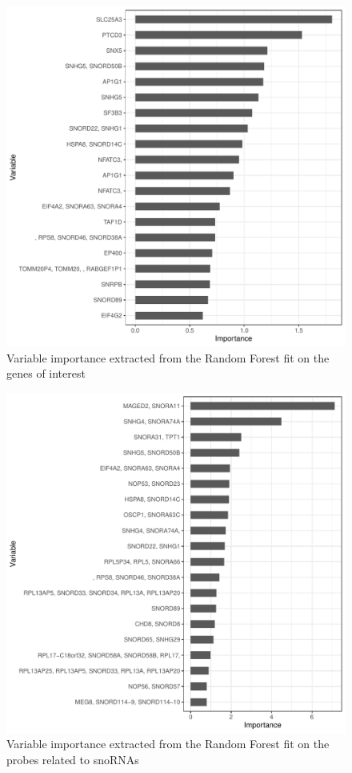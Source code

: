 \documentclass[journal]{IEEEtran}
\begin{document}
\begin{figure}[!ht]
    \centering
    \includegraphics[width=.8\linewidth]{images/vip_rf_voi.pdf}
    \caption{Variable importance extracted from the Random Forest fit on the genes of interest}\label{fig:vip_rf_interest}
\end{figure}

\begin{figure}[!ht]
    \centering
    \includegraphics[width=.8\linewidth]{images/vip_rf_snornas.pdf}
    \caption{Variable importance extracted from the Random Forest fit on the probes related to snoRNAs}\label{fig:vip_rf_snornas}
\end{figure}
\end{document}
